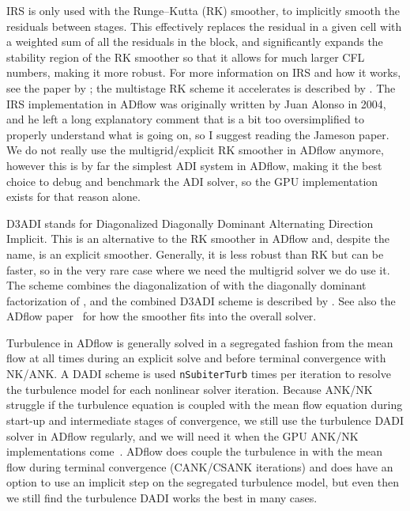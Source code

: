 \documentclass[noinfobox]{mdolab-article}
\newcommand{\code}[1]{\texttt{#1}}
\begin{document}
\begin{description}[leftmargin=*,style=nextline]

  \item[Implicit Residual Smoothing (IRS)]
    IRS is only used with the Runge--Kutta (RK) smoother, to implicitly smooth the residuals between stages.
    This effectively replaces the residual in a given cell with a weighted sum of all the residuals in the block, and significantly expands the stability region of the RK smoother so that it allows for much larger CFL numbers, making it more robust.
    For more information on IRS and how it works, see the paper by \citet{Jameson1984}; the multistage RK scheme it accelerates is described by \citet{Jameson1981a}.
    The IRS implementation in ADflow was originally written by Juan Alonso in 2004, and he left a long explanatory comment that is a bit too oversimplified to properly understand what is going on, so I suggest reading the Jameson paper.
    We do not really use the multigrid/explicit RK smoother in ADflow anymore, however this is by far the simplest ADI system in ADflow, making it the best choice to debug and benchmark the ADI solver, so the GPU implementation exists for that reason alone.

  \item[D3ADI Mean Flow Smoother]
    D3ADI stands for Diagonalized Diagonally Dominant Alternating Direction Implicit.
    This is an alternative to the RK smoother in ADflow and, despite the name, is an explicit smoother.
    Generally, it is less robust than RK but can be faster, so in the very rare case where we need the multigrid solver we do use it.
    The scheme combines the diagonalization of \citet{Pulliam1981} with the diagonally dominant factorization of \citet{Bardina1987}, and the combined D3ADI scheme is described by \citet{Klopfer1998}.
    See also the ADflow paper~\citep{Mader2020a} for how the smoother fits into the overall solver.

  \item[Turbulence DADI Smoother]
    Turbulence in ADflow is generally solved in a segregated fashion from the mean flow at all times during an explicit solve and before terminal convergence with NK/ANK.
    A DADI scheme is used \code{nSubiterTurb} times per iteration to resolve the turbulence model for each nonlinear solver iteration.
    Because ANK/NK struggle if the turbulence equation is coupled with the mean flow equation during start-up and intermediate stages of convergence, we still use the turbulence DADI solver in ADflow regularly, and we will need it when the GPU ANK/NK implementations come~\citep{Yildirim2019b}.
    ADflow does couple the turbulence in with the mean flow during terminal convergence (CANK/CSANK iterations) and does have an option to use an implicit step on the segregated turbulence model, but even then we still find the turbulence DADI works the best in many cases.

\end{description}
\end{document}
